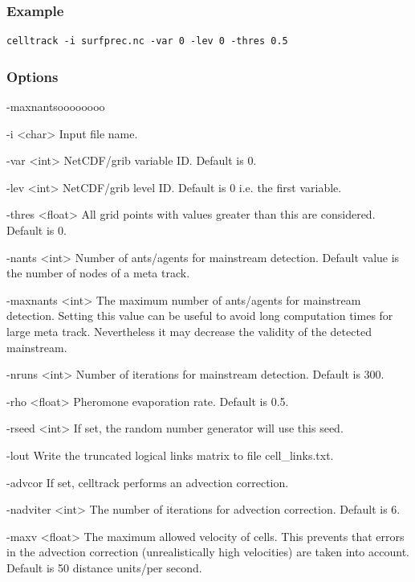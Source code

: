 \documentclass{scrartcl}
\begin{document}
\subsubsection*{Example}
\begin{verbatim}
celltrack -i surfprec.nc -var 0 -lev 0 -thres 0.5
\end{verbatim}

\subsubsection*{Options}
\begin{labeling}{-maxnantsoooooooo}
	\item[-i \textless char\textgreater] Input file name.
	\item[-var \textless int\textgreater] NetCDF/grib variable ID. Default is 0.
	\item[-lev \textless int\textgreater] NetCDF/grib level ID. Default is 0 i.e. the first variable.
	\item[-thres \textless float\textgreater] All grid points with values greater than this are considered. Default is 0.
	\item[-nants \textless int\textgreater] Number of ants/agents for mainstream detection. Default value is the number of nodes of a meta track.
	\item[-maxnants \textless int\textgreater] The maximum number of ants/agents for mainstream detection. Setting this value can be useful to avoid long computation times for large meta track. Nevertheless it may decrease the validity of the detected mainstream.
	\item[-nruns \textless int\textgreater] Number of iterations for mainstream detection. Default is 300.
	\item[-rho \textless float\textgreater] Pheromone evaporation rate. Default is 0.5.
	\item[-rseed \textless int\textgreater] If set, the random number generator will use this seed.
    \item[-lout] Write the truncated logical links matrix to file cell\_links.txt.
    \item[-advcor] If set, celltrack performs an advection correction.
    \item[-nadviter \textless int\textgreater] The number of iterations for advection correction. Default is 6.
    \item[-maxv \textless float\textgreater] The maximum allowed velocity of cells. This prevents that errors in the advection correction (unrealistically high velocities) are taken into account. Default is 50 distance units/per second.

\end{labeling}
\end{document}
